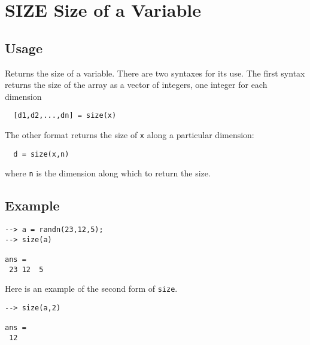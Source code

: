 \section{SIZE Size of a Variable}

\subsection{Usage}

Returns the size of a variable.  There are two syntaxes for its
use.  The first syntax returns the size of the array as a vector
of integers, one integer for each dimension
\begin{verbatim}
  [d1,d2,...,dn] = size(x)
\end{verbatim}
The other format returns the size of \verb|x| along a particular
dimension:
\begin{verbatim}
  d = size(x,n)
\end{verbatim}
where \verb|n| is the dimension along which to return the size.
\subsection{Example}

\begin{verbatim}
--> a = randn(23,12,5);
--> size(a)

ans = 
 23 12  5 
\end{verbatim}
Here is an example of the second form of \verb|size|.
\begin{verbatim}
--> size(a,2)

ans = 
 12 
\end{verbatim}
